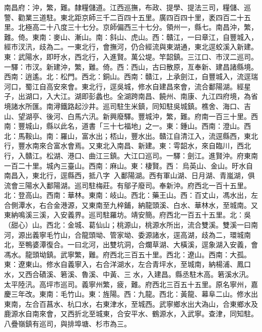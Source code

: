 \begin{pinyinscope}
南昌府：沖，繁，難。隸糧儲道。江西巡撫，布政、提學、提法三司，糧儲、巡警、勸業三道駐。東北距京師三千二百四十五里。廣四百四十里，袤四百二十五里。北極高二十八度三十七分。京師偏西三十七分。領州一，縣七。南昌沖，繁，難。倚。東南：麥山、漸山。南：斜山、虎山。西：贛江，一曰章江，自豐城入，經巿汊汛，歧為二。一東北行，會撫河，仍合經流與東湖通，東北逕蛟溪入新建。東：武陽水，即旴水，西北行，入進賢。萬公堤。竿韶鎮。三江口、巿汊二巡司。一驛：巿汊。新建沖，繁，難。倚。西：西山，古曰散原，亙奉新、建昌諸縣境。西南：逍遙。北：松門。西北：銅山。西南：贛江，上承劍江，自豐城入，流逕瑞河口，蜀江自高安來會。東北行，逕吳城，修水自建昌來會，流合鄱陽湖。經星子，出湖口，入大江。湖即彭蠡也。全湖跨南昌、饒州、南康、九江四府境，為省境諸水所匯。南潯鐵路起沙井。巡司駐生米鎮，同知駐吳城鎮。樵舍、海口、吉山、望湖亭、後河、白馬六汛。新興廢驛。豐城沖，繁，難。府南一百三十里。西南：豐城山，縣以此名，道書「三十七福地」之一。東：鍾山。西南：澄山。西北：馬鞍山。南：羅山，富水出；桮山，豐水出。贛江自清江入，流逕縣西，東北行，豐水南來合富水會焉。又東北入南昌、新建。東：雩韶水，來自臨川，西北行，入贛江。松湖、港口、曲江三鎮。大江口巡司。一驛：劍江。進賢沖。府東南一百二十里。城內三臺山。西南：麻山。東：棲賢。西：烏英山、金山。旴水自南昌入，東北行，逕縣西，抵八字，入鄱陽湖。西有軍山湖、日月湖、青嵐湖，俱流會三陽水入鄱陽湖。巡司駐梅莊。有鄔子廢司。奉新沖。府西北一百十五里。北：登高山。西南：華林。東南：岐山。西北：藥王山。西：百丈山，馮水出，左合側潭水，右合金港源，又東南至九梓鋪，納龍頭溪、白水、華林水，至城南。又東納鳴溪三溪，入安義界。巡司駐羅坊。靖安簡。府西北一百五十五里。北：吳（甜心）山。西北：金城、葛仙山；桃源山，桃源水所出，流合雙溪。雙溪一曰南河，源出義寧毛竹山，合龍頭坳、管家坳、委源諸水，逕高湖，歧為二，環城南北，至鴨婆潭復合。一曰北河，出雙坑洞，合爛草湖、大橫溪，逕象湖入安義，會馮水。龍頭坳鎮。武寧繁，難。府西北三百五十里。西北：遼山。西南：大孤。東：遼東山。修水自義寧入，右合洋湖水，左合青坪水，至城南，納楊浦、鳳口水，又西合磧溪、箬溪、魯溪、中黃、三水，入建昌。縣丞駐木高。箬溪水汛。太平陸汛。高坪巿巡司。義寧州繁，疲，難。府西北三百五十五里。原名寧州，嘉慶三年改。東南：毛竹山。東：旌陽。西：九龍。西北：黃龍、幕阜二山。修水出東南，左合百菖水、杭口水，右東津水，至城西。武寧鄉水出大溈山，合東鄉水及鹿源水自南來會，又西折北至城東，合安平水、鶴源水，入武寧。查津，同知駐。八疊嶺鎮有巡司，與排埠塘、杉巿為三。


\end{pinyinscope}
